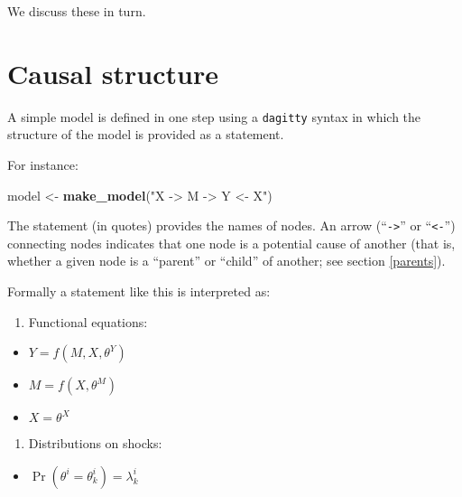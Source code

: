 \documentclass[
  12pt,
]{book}
\newenvironment{Shaded}{\begin{snugshade}}{\end{snugshade}}
\newcommand{\FunctionTok}[1]{\textcolor[rgb]{0.13,0.29,0.53}{\textbf{#1}}}
\newcommand{\NormalTok}[1]{#1}
\newcommand{\OtherTok}[1]{\textcolor[rgb]{0.56,0.35,0.01}{#1}}
\newcommand{\StringTok}[1]{\textcolor[rgb]{0.31,0.60,0.02}{#1}}
\providecommand{\tightlist}{%
  \setlength{\itemsep}{0pt}\setlength{\parskip}{0pt}}
\begin{document}
We discuss these in turn.

\hypertarget{structure}{%
\section{Causal structure}\label{structure}}

A simple model is defined in one step using a \texttt{dagitty} syntax in which the structure of the model is provided as a statement.

For instance:

\begin{Shaded}
\begin{Highlighting}[]
\NormalTok{model }\OtherTok{\textless{}{-}} \FunctionTok{make\_model}\NormalTok{(}\StringTok{"X {-}\textgreater{} M {-}\textgreater{} Y \textless{}{-} X"}\NormalTok{)}
\end{Highlighting}
\end{Shaded}

The statement (in quotes) provides the names of nodes. An arrow (``\texttt{-\textgreater{}}'' or ``\texttt{\textless{}-}'') connecting nodes indicates that one node is a potential cause of another (that is, whether a given node is a ``parent'' or ``child'' of another; see section \ref{parents}).

Formally a statement like this is interpreted as:

\begin{enumerate}
\def\labelenumi{\arabic{enumi}.}
\tightlist
\item
  Functional equations:
\end{enumerate}

\begin{itemize}
\tightlist
\item
  \(Y = f(M, X, \theta^Y)\)
\item
  \(M = f(X, \theta^M)\)
\item
  \(X = \theta^X\)
\end{itemize}

\begin{enumerate}
\def\labelenumi{\arabic{enumi}.}
\setcounter{enumi}{1}
\tightlist
\item
  Distributions on shocks:
\end{enumerate}

\begin{itemize}
\tightlist
\item
  \(\Pr(\theta^i = \theta^i_k) = \lambda^i_k\)
\end{itemize}
\end{document}
